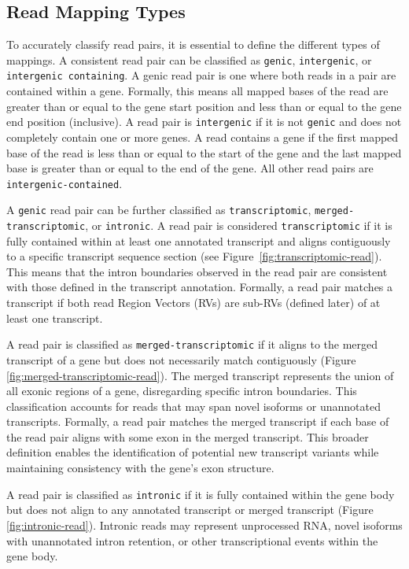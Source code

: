 \documentclass{article}
\begin{document}
    \subsection{Read Mapping Types}

    To accurately classify read pairs, it is essential to define the different types of mappings. A consistent read pair can be classified as \texttt{genic}, \texttt{intergenic}, or \texttt{intergenic containing}. A genic read pair is one where both reads in a pair are contained within a gene. Formally, this means all mapped bases of the read are greater than or equal to the gene start position and less than or equal to the gene end position (inclusive). A read pair is \texttt{intergenic} if it is not \texttt{genic} and does not completely contain one or more genes. A read contains a gene if the first mapped base of the read is less than or equal to the start of the gene and the last mapped base is greater than or equal to the end of the gene. All other read pairs are \texttt{intergenic-contained}.

    A \texttt{genic} read pair can be further classified as \texttt{transcriptomic}, \texttt{merged-transcriptomic}, or \texttt{intronic}. A read pair is considered \texttt{transcriptomic} if it is fully contained within at least one annotated transcript and aligns contiguously to a specific transcript sequence section (see Figure~\ref{fig:transcriptomic-read}). This means that the intron boundaries observed in the read pair are consistent with those defined in the transcript annotation. Formally, a read pair matches a transcript if both read Region Vectors (RVs) are sub-RVs (defined later) of at least one transcript.

    A read pair is classified as \texttt{merged-transcriptomic} if it aligns to the merged transcript of a gene but does not necessarily match contiguously (Figure \ref{fig:merged-transcriptomic-read}). The merged transcript represents the union of all exonic regions of a gene, disregarding specific intron boundaries. This classification accounts for reads that may span novel isoforms or unannotated transcripts. Formally, a read pair matches the merged transcript if each base of the read pair aligns with some exon in the merged transcript. This broader definition enables the identification of potential new transcript variants while maintaining consistency with the gene's exon structure.

    A read pair is classified as \texttt{intronic} if it is fully contained within the gene body but does not align to any annotated transcript or merged transcript (Figure \ref{fig:intronic-read}). Intronic reads may represent unprocessed RNA, novel isoforms with unannotated intron retention, or other transcriptional events within the gene body.
\end{document}
